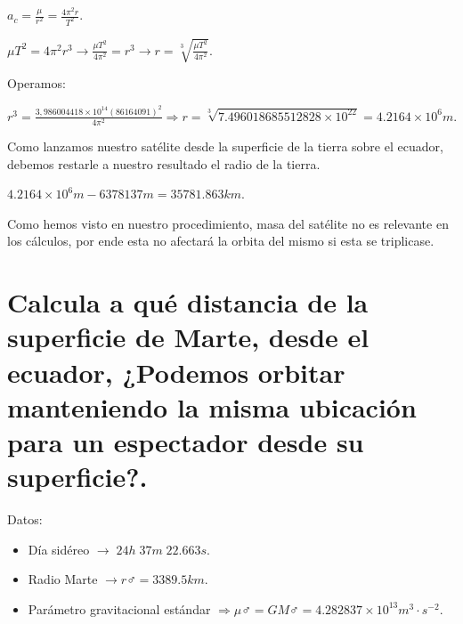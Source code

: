 \documentclass[a4paper,12pt]{article}
\begin{document}
\(a_c = \frac{\mu }{r^2} = \frac{4\pi^2 r}{T^2}.\) 
\vspace{\baselineskip}


\(\mu T^2 = 4\pi^2 r^3 \rightarrow  \frac{\mu T^2}{4\pi^2}=r^3 \rightarrow r = \sqrt[3]{\frac{\mu T^2}{4\pi^2}}. \)
\vspace{\baselineskip}

\begin{justify}
    Operamos: 
\end{justify}

\(r^3 = \frac{3,986004418 \times 10^{14}\left(86164091\right)^2}{4\pi^2} \Rightarrow r = \sqrt[3]{7.496018685512828\times 10^{22}} = 4.2164\times 10^{6}m.  \)
\vspace{\baselineskip}

\begin{justify}
    Como lanzamos nuestro satélite desde la superficie de la tierra sobre el ecuador, debemos restarle a nuestro resultado el radio de la tierra.
\end{justify}
\begin{center}
    
\(4.2164\times 10^{6}m - 6378137m = 35781.863 km\).
\end{center}

\begin{justify}
    Como hemos visto en nuestro procedimiento, masa del satélite no es relevante en los cálculos, por ende esta no afectará la orbita del mismo si esta se triplicase.
\end{justify}


\section{Calcula a qué distancia de la superficie de Marte, desde el ecuador, ¿Podemos orbitar manteniendo la misma ubicación para un espectador desde su superficie?.}

\vspace{\baselineskip}

\begin{justify}
    Datos:
\end{justify}
\begin{itemize}
    \item Día sidéreo  \(\rightarrow \;24h \; 37m \; 22.663s\).
    \item Radio Marte \(\rightarrow r \male = 3389.5 km\).
    \item Parámetro gravitacional estándar \(\Rightarrow \mu\male = GM\male = 4.282837 \times 10^{13} m^3\cdot s^{-2}\).
\end{itemize}
\end{document}
